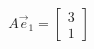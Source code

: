 \documentclass[preview]{standalone}
\begin{document}
\begin{align*}
A\vec{e}_1=\begin{bmatrix}3\\1\end{bmatrix}
\end{align*}
\end{document}
